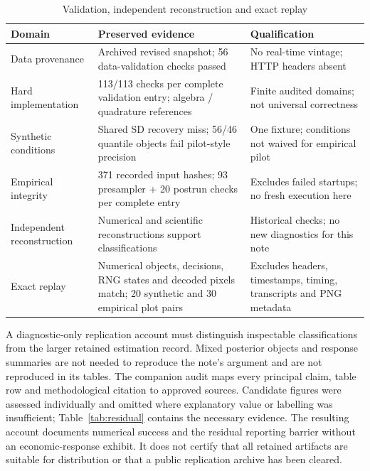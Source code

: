 \documentclass[11pt,a4paper]{article}
\renewcommand{\thetable}{T\arabic{table}}
\begin{document}
\begin{table}[htbp]
\centering\small
\setcounter{table}{0}
\renewcommand{\thetable}{AT\arabic{table}}
\renewcommand{\theHtable}{AT\arabic{table}}
\caption{Validation, independent reconstruction and exact replay}\label{tab:replication}
\begin{tabularx}{\textwidth}{@{}P{.22\textwidth}LL@{}}
\toprule
Domain & Preserved evidence & Qualification \\
\midrule
Data provenance & Archived revised snapshot; 56 data-validation checks passed & No real-time vintage; HTTP headers absent \\
Hard implementation & 113/113 checks per complete validation entry; algebra / quadrature references & Finite audited domains; not universal correctness \\
Synthetic conditions & Shared SD recovery miss; 56/46 quantile objects fail pilot-style precision & One fixture; conditions not waived for empirical pilot \\
Empirical integrity & 371 recorded input hashes; 93 presampler + 20 postrun checks per complete entry & Excludes failed startups; no fresh execution here \\
Independent reconstruction & Numerical and scientific reconstructions support classifications & Historical checks; no new diagnostics for this note \\
Exact replay & Numerical objects, decisions, RNG states and decoded pixels match; 20 synthetic and 30 empirical plot pairs & Excludes headers, timestamps, timing, transcripts and PNG metadata \\
\bottomrule
\end{tabularx}
\end{table}

A diagnostic-only replication account must distinguish inspectable classifications from the larger retained estimation record. Mixed posterior objects and response summaries are not needed to reproduce the note's argument and are not reproduced in its tables. The companion audit maps every principal claim, table row and methodological citation to approved sources. Candidate figures were assessed individually and omitted where explanatory value or labelling was insufficient; Table~\ref{tab:residual} contains the necessary evidence. The resulting account documents numerical success and the residual reporting barrier without an economic-response exhibit. It does not certify that all retained artifacts are suitable for distribution or that a public replication archive has been cleared.
\end{document}
